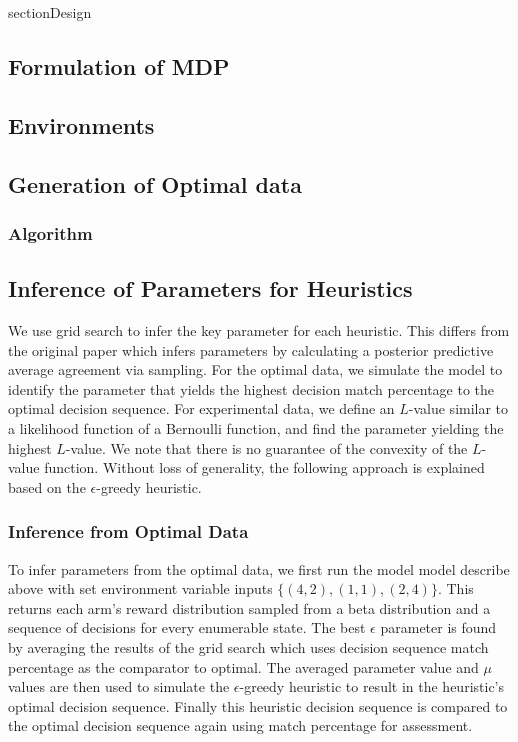 section{Design}
\label{design}


\subsection{Formulation of MDP}

\subsection{Environments}



\subsection{Generation of Optimal data}

\subsubsection{Algorithm}



\subsection{Inference of Parameters for Heuristics}
We use grid search to infer the key parameter for each heuristic. This differs from the original paper which infers parameters by calculating a posterior predictive average agreement via sampling. For the optimal data, we simulate the model to identify the parameter that yields the highest decision match percentage to the optimal decision sequence. For experimental data, we define an $L$-value similar to a likelihood function of a Bernoulli function, and find the parameter yielding the highest $L$-value. We note that there is no guarantee of the convexity of the $L$-value function. Without loss of generality, the following approach is explained based on the $\epsilon$-greedy heuristic. 

\subsubsection{Inference from Optimal Data}
To infer parameters from the optimal data, we first run the model model describe above with set environment variable inputs $\{(4,2), (1,1), (2,4)\}$. This returns each arm's reward distribution sampled from a beta distribution and a sequence of decisions for every enumerable state. The best $\epsilon$ parameter is found by averaging the results of the grid search which uses decision sequence match percentage as the comparator to optimal. The averaged parameter value and $\mu$ values are then used to simulate the $\epsilon$-greedy heuristic to result in the heuristic's optimal decision sequence. Finally this heuristic decision sequence is compared to the optimal decision sequence again using match percentage for assessment.

